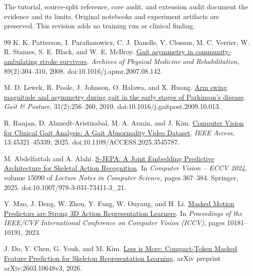 \documentclass{article}
\begin{document}
The {tutorial}, {source-split reference}, {core audit}, and {extension audit} document the evidence and its limits. Original notebooks and experiment artifacts are preserved. This revision adds no training run or clinical finding.
\label{physworld:main-last}
\clearpage
\label{physworld:references-start}
{\renewcommand{\bibfont}{\small}
\begin{thebibliography}{99}
 K. K. Patterson, I. Parafianowicz, C. J. Danells, V. Closson, M. C. Verrier, W. R. Staines, S. E. Black, and W. E. McIlroy. \href{https://pubmed.ncbi.nlm.nih.gov/18226655/}{Gait asymmetry in community-ambulating stroke survivors}. \emph{Archives of Physical Medicine and Rehabilitation}, 89(2):304--310, 2008. doi:10.1016/j.apmr.2007.08.142.

 M. D. Lewek, R. Poole, J. Johnson, O. Halawa, and X. Huang. \href{https://pubmed.ncbi.nlm.nih.gov/19945285/}{Arm swing magnitude and asymmetry during gait in the early stages of Parkinson's disease}. \emph{Gait \& Posture}, 31(2):256--260, 2010. doi:10.1016/j.gaitpost.2009.10.013.

 R. Ranjan, D. Ahmedt-Aristizabal, M. A. Armin, and J. Kim. \href{https://arxiv.org/abs/2407.04190}{Computer Vision for Clinical Gait Analysis: A Gait Abnormality Video Dataset}. \emph{IEEE Access}, 13:45321--45339, 2025. doi:10.1109/ACCESS.2025.3545787.

 M. Abdelfattah and A. Alahi. \href{https://www.ecva.net/papers/eccv_2024/papers_ECCV/papers/04755.pdf}{S-JEPA: A Joint Embedding Predictive Architecture for Skeletal Action Recognition}. In \emph{Computer Vision -- ECCV 2024}, volume 15090 of \emph{Lecture Notes in Computer Science}, pages 367--384. Springer, 2025. doi:10.1007/978-3-031-73411-3\_21.

 Y. Mao, J. Deng, W. Zhou, Y. Fang, W. Ouyang, and H. Li. \href{https://arxiv.org/abs/2308.07092}{Masked Motion Predictors are Strong 3D Action Representation Learners}. In \emph{Proceedings of the IEEE/CVF International Conference on Computer Vision (ICCV)}, pages 10181--10191, 2023.

 J. Do, Y. Chen, G. Youk, and M. Kim. \href{https://arxiv.org/abs/2603.10648}{Less is More: Compact-Token Masked Feature Prediction for Skeleton Representation Learning}. arXiv preprint arXiv:2603.10648v3, 2026.
\end{thebibliography}
}
\end{document}
